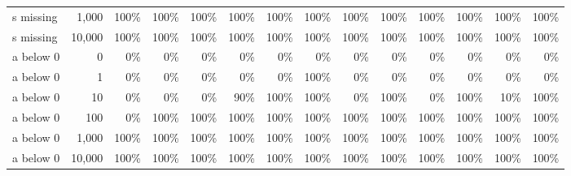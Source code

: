 \begin{table}[t]
\begin{adjustbox}{max width=\linewidth}
\begin{tabular}{@{}lrrrrrrrrrrrrr@{}}
s missing & 1,000 & 100\% & 100\% & 100\% & 100\% & 100\% & 100\% & 100\% & 100\% & 100\% & 100\% & 100\% & 100\% \\
s missing & 10,000 & 100\% & 100\% & 100\% & 100\% & 100\% & 100\% & 100\% & 100\% & 100\% & 100\% & 100\% & 100\% \\
a below 0 & 0 & 0\% & 0\% & 0\% & 0\% & 0\% & 0\% & 0\% & 0\% & 0\% & 0\% & 0\% & 0\% \\
a below 0 & 1 & 0\% & 0\% & 0\% & 0\% & 0\% & 100\% & 0\% & 0\% & 0\% & 0\% & 0\% & 0\% \\
a below 0 & 10 & 0\% & 0\% & 0\% & 90\% & 100\% & 100\% & 0\% & 100\% & 0\% & 100\% & 10\% & 100\% \\
a below 0 & 100 & 0\% & 100\% & 100\% & 100\% & 100\% & 100\% & 100\% & 100\% & 100\% & 100\% & 100\% & 100\% \\
a below 0 & 1,000 & 100\% & 100\% & 100\% & 100\% & 100\% & 100\% & 100\% & 100\% & 100\% & 100\% & 100\% & 100\% \\
a below 0 & 10,000 & 100\% & 100\% & 100\% & 100\% & 100\% & 100\% & 100\% & 100\% & 100\% & 100\% & 100\% & 100\% \\
\bottomrule
\end{tabular}
\end{adjustbox}
\end{table}
